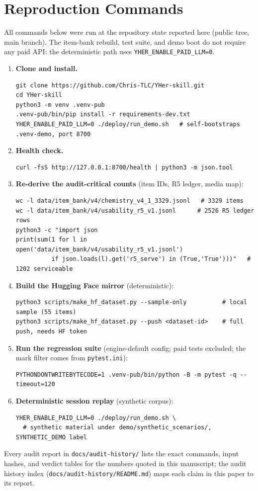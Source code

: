 \appendix
\section{Reproduction Commands}
\label{app:commands}

All commands below were run at the repository state reported here (public tree, main branch). The item-bank rebuild, test suite, and demo boot do not require any paid API: the deterministic path uses \texttt{YHER\_ENABLE\_PAID\_LLM=0}.

\begin{enumerate}\setlength{\itemsep}{0pt}\setlength{\parskip}{0pt}\setlength{\parsep}{0pt}
\item \textbf{Clone and install.}
\small
\begin{verbatim}
git clone https://github.com/Chris-TLC/YHer-skill.git
cd YHer-skill
python3 -m venv .venv-pub
.venv-pub/bin/pip install -r requirements-dev.txt
YHER_ENABLE_PAID_LLM=0 ./deploy/run_demo.sh   # self-bootstraps .venv-demo, port 8700
\end{verbatim}
\item \textbf{Health check.}
\small
\small
\begin{verbatim}
curl -fsS http://127.0.0.1:8700/health | python3 -m json.tool
\end{verbatim}
\item \textbf{Re-derive the audit-critical counts} (item IDs, R5 ledger, media map):
\small
\small
\begin{verbatim}
wc -l data/item_bank/v4/chemistry_v4_1_3329.jsonl   # 3329 items
wc -l data/item_bank/v4/usability_r5_v1.jsonl      # 2526 R5 ledger rows
python3 -c "import json
print(sum(1 for l in open('data/item_bank/v4/usability_r5_v1.jsonl')
          if json.loads(l).get('r5_serve') in (True,'True')))"   # 1202 serviceable
\end{verbatim}
\item \textbf{Build the Hugging Face mirror} (deterministic):
\small
\small
\begin{verbatim}
python3 scripts/make_hf_dataset.py --sample-only          # local sample (55 items)
python3 scripts/make_hf_dataset.py --push <dataset-id>    # full push, needs HF token
\end{verbatim}
\item \textbf{Run the regression suite} (engine-default config; paid tests excluded; the mark filter comes from \texttt{pytest.ini}):
\small
\begin{verbatim}
PYTHONDONTWRITEBYTECODE=1 .venv-pub/bin/python -B -m pytest -q --timeout=120
\end{verbatim}
\item \textbf{Deterministic session replay} (synthetic corpus):
\small
\small
\begin{verbatim}
YHER_ENABLE_PAID_LLM=0 ./deploy/run_demo.sh \
  # synthetic material under demo/synthetic_scenarios/, SYNTHETIC_DEMO label
\end{verbatim}
\end{enumerate}

Every audit report in \texttt{docs/audit-history/} lists the exact commands, input hashes, and verdict tables for the numbers quoted in this manuscript; the audit history index (\texttt{docs/audit-history/README.md}) maps each claim in this paper to its report.
